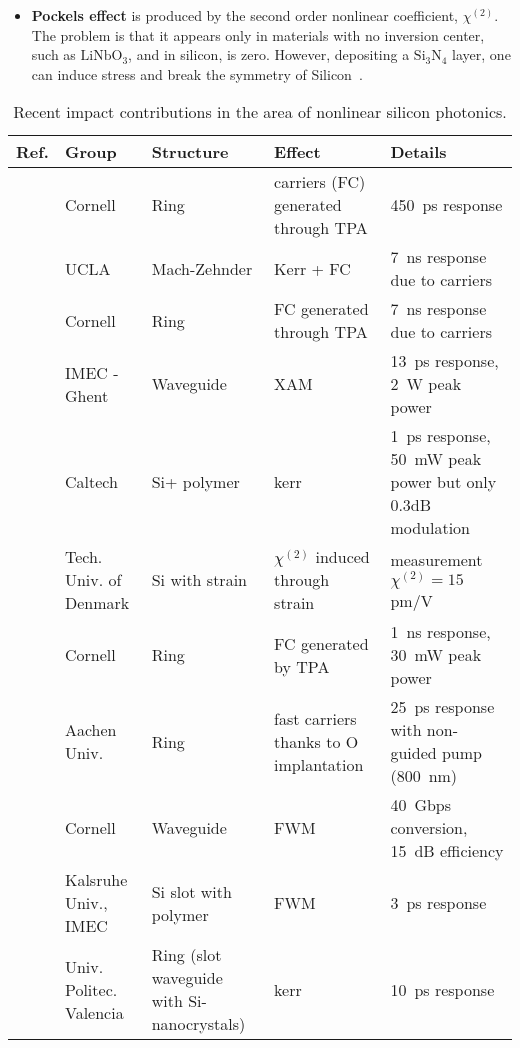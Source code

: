 \begin{itemize}
\item \textbf{Pockels effect} is produced by the second order nonlinear coefficient, $\chi^{(2)}$. The problem is that it appears only in materials with no inversion center, such as $\mathrm{LiNbO}_3$, and in silicon, is zero. However, depositing a $\mathrm{Si_3N_4}$ layer, one can induce stress and break the symmetry of Silicon~\cite{Jacobsen2006,Cazzanelli2012,Chmielak2011}.
\end{itemize}

\begin{table}
\centering
\begin{tabulary}{1.00\textwidth}{|L|L|L|L|L|}\hline 
\textbf{Ref.} & \textbf{Group} & \textbf{Structure} & \textbf{Effect} & \textbf{Details}\\ \hline
\cite{Almeida2004b} & Cornell & Ring & carriers (FC) generated through TPA & 450~ps response\\ \hline
\cite{Boyraz2004} & UCLA & Mach-Zehnder & Kerr + FC & 7~ns response due to carriers\\ \hline
\cite{Preble2005}& Cornell & Ring & FC generated through TPA & 7~ns response due to carriers\\ \hline
\cite{Liang:05}& IMEC - Ghent  & Waveguide & XAM & 13~ps response, 2~W peak power\\ \hline
\cite{Hochberg2006}& Caltech  & Si+ polymer & kerr & 1~ps response, 50~mW peak power but only 0.3dB modulation\\ \hline
\cite{Jacobsen2006} & Tech. Univ. of Denmark  & Si with strain & $\chi^{(2)}$ induced through strain &  measurement $\chi^{(2)} =15~$pm/V \\ \hline
\cite{Foster2007} & Cornell  & Ring & FC generated by TPA & 1~ns response, 30~mW peak power 	\\ \hline
\cite{Waldow2008} & Aachen Univ.  & Ring & fast carriers thanks to O implantation & 25~ps response with non-guided pump (800~nm) 	\\ \hline
\cite{Lee2009} & Cornell  & Waveguide & FWM & 40~Gbps conversion, 15~dB efficiency 	\\ \hline
\cite{Koos2009} & Kalsruhe Univ., IMEC  & Si slot with polymer & FWM & 3~ps response	\\ \hline
\cite{Martinez2010}& Univ. Politec. Valencia & Ring (slot waveguide with Si-nanocrystals)  & kerr & 10~ps response 	\\ \hline
\end{tabulary}
\caption{Recent impact contributions in the area of nonlinear silicon photonics.}
\label{tab:nonlinearDevices}
\end{table}



